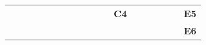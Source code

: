 \begin{landscape}
\begin{table}[h!]
\begin{tabular}{lcllcllcllcllcllcl}
\multicolumn{1}{l|}{}     & \multicolumn{1}{c|}{}                                                                                                   &                              & \multicolumn{1}{l|}{}   & \multicolumn{1}{c|}{}                                                                                                      &                               & \multicolumn{1}{l|}{}   & \multicolumn{1}{c|}{}                                                                                                   &                               & \multicolumn{1}{l|}{}   & \multicolumn{1}{c|}{}                                                                                            & {\bf C4}                      & \multicolumn{1}{l|}{}   & \multicolumn{1}{c|}{}                                                                                                              &                               & \multicolumn{1}{l|}{}   & \multicolumn{1}{c|}{}                                                                                                        & {\bf E5}                      \\
\multicolumn{1}{l|}{}     & \multicolumn{1}{c|}{}                                                                                                   &                              & \multicolumn{1}{l|}{}   & \multicolumn{1}{c|}{}                                                                                                      &                               & \multicolumn{1}{l|}{}   & \multicolumn{1}{c|}{}                                                                                                   &                               & \multicolumn{1}{l|}{}   & \multicolumn{1}{c|}{}                                                                                            &                               & \multicolumn{1}{l|}{}   & \multicolumn{1}{c|}{}                                                                                                              &                               & \multicolumn{1}{l|}{}   & \multicolumn{1}{c|}{}                                                                                                        & {\bf E6}                      \\ \cline{1-1} \cline{3-4} \cline{6-7} \cline{9-10} \cline{12-13} \cline{15-16} \cline{18-18} 

\end{tabular}
\end{table}
\end{landscape}
